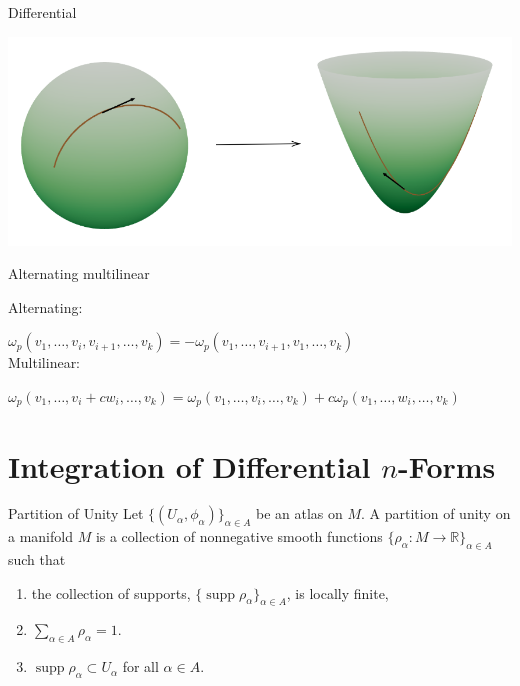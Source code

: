 \documentclass[9pt]{beamer}
\DeclareMathOperator{\supp}{supp}
\begin{document}
\begin{frame}{Differential}

    \includegraphics[scale=0.6]{differential.PNG}
\end{frame}

\begin{frame}{Alternating multilinear}
    \begin{center}
        Alternating:

        $\omega_p(v_1, \dots, v_i, v_{i+1}, \dots, v_k)=-\omega_p(v_1, \dots, v_{i+1}, v_1, \dots, v_k)$\\[15pt]

        Multilinear:

        $\omega_p(v_1, \dots,v_i+cw_i, \dots, v_k)=\omega_p(v_1, \dots,v_i, \dots, v_k)+c\omega_p(v_1, \dots,w_i, \dots, v_k)$
    \end{center}
\end{frame}

\section{Integration of Differential \texorpdfstring{$n$}{n}-Forms}

\begin{frame}
    \begin{block}{Partition of Unity}
        Let $\{(U_\alpha, \phi_\alpha)\}_{\alpha\in A}$ be an atlas on $M$. A partition of unity on a manifold $M$ is a collection of nonnegative smooth functions $\{\rho_\alpha:M \rightarrow \mathbb{R}\}_{\alpha\in A}$ such that \begin{enumerate}[i]
            \item the collection of supports, $\{\supp\rho_\alpha\}_{\alpha\in A}$, is locally finite,
            \item $\sum_{\alpha\in A} \rho_\alpha = 1.$
            \item $\supp \rho_\alpha\subset U_\alpha$ for all $\alpha\in A$.
        \end{enumerate}
    \end{block}
\end{frame}
\end{document}
